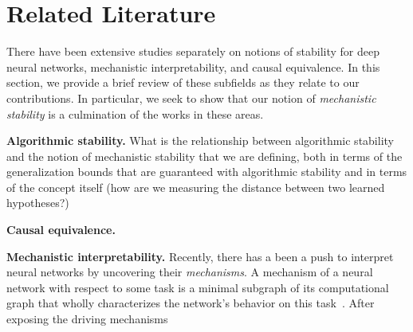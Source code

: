 
\section{Related Literature}
There have been extensive studies separately on notions of stability for
deep neural networks, mechanistic interpretability, and causal equivalence.
In this section, we provide a brief review of these subfields as they
relate to our contributions. In particular, we seek to show that our notion
of \textit{mechanistic stability} is a culmination of the works in these areas.

\textbf{Algorithmic stability.} What is the relationship between algorithmic
stability and the notion of mechanistic stability that we are defining, both
in terms of the generalization bounds that are guaranteed with algorithmic
stability and in terms of the concept itself (how are we measuring
the distance between two learned hypotheses?)

\textbf{Causal equivalence.} 

\textbf{Mechanistic interpretability.} Recently, there has a been a push to interpret
neural networks by uncovering their
\textit{mechanisms}. A mechanism of a neural network with respect to some task
is a minimal subgraph of its computational graph that wholly characterizes the
network's behavior on this task~\citep{wang_interpretability_2022}. After exposing
the driving mechanisms 
